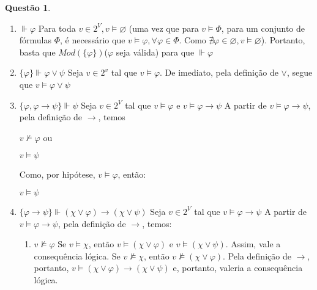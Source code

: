 \documentclass[tikz,border=5]{article}
\theoremstyle{definition}
\newtheorem{exerc}{Questão}
\begin{document}
	\begin{exerc}
	    $ $
	    \begin{enumerate}
	        \item $\Vdash \varphi$ \newline Para toda $v \in 2^{V}, v \vDash \varnothing$ (uma vez que para $v \vDash \Phi$, para um conjunto de fórmulas $\Phi$, é necessário que $v \vDash \varphi, \forall \varphi \in \Phi$. Como $\nexists \varphi \in \varnothing, v \vDash \varnothing$). \newline Portanto, basta que $Mod(\{\varphi\})$($\varphi$ seja válida) para que $\Vdash \varphi$
	        \item $\{\varphi\} \Vdash \varphi \vee \psi$ \newline Seja $v \in 2^{v}$ tal que $v \vDash \varphi$. De imediato, pela definição de $\vee$, segue que $v \vDash \varphi \vee \psi$
	        \item $\{\varphi, \varphi \rightarrow \psi\} \Vdash \psi$ \newline Seja $v \in 2^{V}$ tal que $v \vDash \varphi$ e $v \vDash \varphi \rightarrow \psi$ \newline A partir de $v \vDash \varphi \rightarrow \psi$, pela definição de $\rightarrow$, temos \begin{center} $v \nvDash \varphi$ ou \end{center} \begin{center} $v \vDash \psi$ \end{center} Como, por hipótese, $v \vDash \varphi$, então: \begin{center} $v \vDash \psi$ \end{center}
	        \item $\{\varphi \rightarrow \psi\} \Vdash (\chi \vee \varphi) \rightarrow (\chi \vee \psi)$ \newline Seja $v \in 2^{V}$ tal que $v \vDash \varphi \rightarrow \psi$ \newline A partir de $v \vDash \varphi \rightarrow \psi$, pela definição de $\rightarrow$, temos: \begin{enumerate}
	            \item $v \nvDash \varphi$ \newline Se $v \vDash \chi$, então $v \vDash (\chi \vee \varphi)$ e $v \vDash (\chi \vee \psi)$. Assim, vale a consequência lógica. \newline Se $v \nvDash \chi$, então $v \nvDash (\chi \vee \varphi)$. Pela definição de $\rightarrow$, portanto, $v \vDash (\chi \vee \varphi) \rightarrow (\chi \vee \psi)$ e, portanto, valeria a consequência lógica.

\end{enumerate}
\end{enumerate}
\end{exerc}
\end{document}
